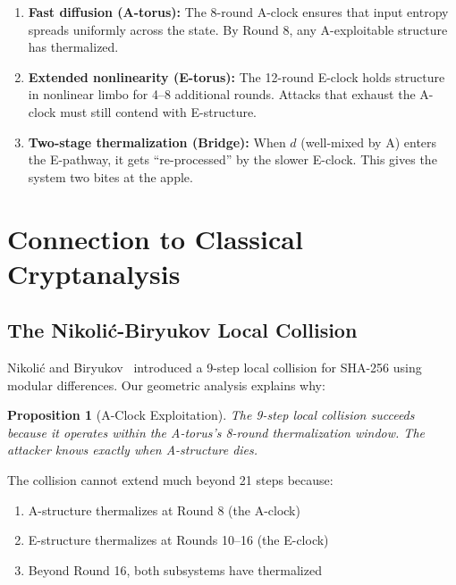 \documentclass[11pt,a4paper]{article}
\theoremstyle{plain}
\newtheorem{proposition}[theorem]{Proposition}
\theoremstyle{definition}
\theoremstyle{remark}
\begin{document}
\begin{enumerate}
    \item \textbf{Fast diffusion (A-torus):} The 8-round A-clock ensures that input entropy spreads uniformly across the state. By Round 8, any A-exploitable structure has thermalized.
    
    \item \textbf{Extended nonlinearity (E-torus):} The 12-round E-clock holds structure in nonlinear limbo for 4--8 additional rounds. Attacks that exhaust the A-clock must still contend with E-structure.
    
    \item \textbf{Two-stage thermalization (Bridge):} When $d$ (well-mixed by A) enters the E-pathway, it gets ``re-processed'' by the slower E-clock. This gives the system two bites at the apple.
\end{enumerate}

\section{Connection to Classical Cryptanalysis}

\subsection{The Nikoli\'{c}-Biryukov Local Collision}

Nikoli\'{c} and Biryukov~\cite{nikolic2008} introduced a 9-step local collision for SHA-256 using modular differences. Our geometric analysis explains why:

\begin{proposition}[A-Clock Exploitation]
The 9-step local collision succeeds because it operates within the A-torus's 8-round thermalization window. The attacker knows \emph{exactly} when A-structure dies.
\end{proposition}

The collision cannot extend much beyond 21 steps because:
\begin{enumerate}
    \item A-structure thermalizes at Round 8 (the A-clock)
    \item E-structure thermalizes at Rounds 10--16 (the E-clock)
    \item Beyond Round 16, both subsystems have thermalized
\end{enumerate}
\end{document}
